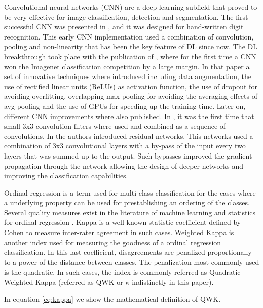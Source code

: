\documentclass[review]{elsarticle}
\theoremstyle{definition} %
\theoremstyle{remark}
\begin{document}
Convolutional neural networks (CNN) are a deep learning subfield that proved to be very effective for image classification, detection and segmentation. The first successful CNN was presented in \cite{LeCun:98}, and it was designed for hand-written digit recognition. This early CNN implementation used a combination of convolution, pooling and non-linearity that has been the key feature of DL since now. The DL breakthrough took place with the publication of \cite{NIPS2012_4824}, where for the first time a CNN won the Imagenet\cite{imagenet_cvpr09} classification competition by a large margin. In that paper a set of innovative techniques where introduced including data augmentation, the use of rectified linear units (ReLUs) as activation function, the use of dropout for avoiding overfitting, overlapping max-pooling for avoiding the averaging effects of avg-pooling and the use of GPUs for speeding up the training time. Later on, different CNN improvements where also published. In \cite{vggnet}, it was the first time that small 3x3 convolution filters where used and combined as a sequence of convolutions. In \cite{he2016deep} the authors introduced residual networks. This networks used a combination of 3x3 convolutional layers with a by-pass of the input every two layers that was summed up to the output. Such bypasses improved the gradient propagation through the network allowing the design of deeper networks and improving the classification capabilities. 

Ordinal regression is a term used for multi-class classification for the cases where a underlying property can be used for prestablishing an ordering of the classes. Several quality measures exist in the literature of machine learning and statistics for ordinal regression \citep{mehdiyev2016evaluating}. Kappa is a well-known statistic coefficient defined by Cohen \citep{cohen1960coefficient} to measure inter-rater agreement in such cases. Weighted Kappa \citep{cohen1968weighted} is another index used for measuring the goodness of a ordinal regression classification. In this last coefficient, disagreements are penalized proportionally to a power of the distance between classes. The penalization most commonly used is the quadratic. In such cases, the index is commonly referred as Quadratic Weighted Kappa (referred as QWK or $\kappa$ indistinctly in this paper).

In equation \ref{eq:kappa} we show the mathematical definition of QWK.
\end{document}
